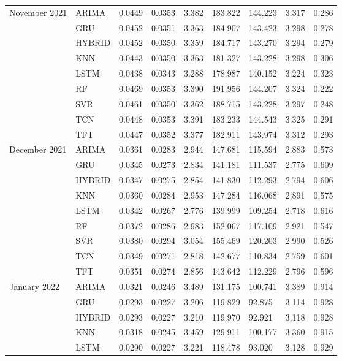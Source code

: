 \begin{tabular}{lllllllll}
November 2021 & ARIMA & 0.0449 & 0.0353 & 3.382 & 183.822 & 144.223 & 3.317 & 0.286 \\
 & GRU & 0.0452 & 0.0351 & 3.363 & 184.907 & 143.423 & 3.298 & 0.278 \\
 & HYBRID & 0.0452 & 0.0350 & 3.359 & 184.717 & 143.270 & 3.294 & 0.279 \\
 & KNN & 0.0443 & 0.0350 & 3.363 & 181.327 & 143.228 & 3.298 & 0.306 \\
 & LSTM & 0.0438 & 0.0343 & 3.288 & 178.987 & 140.152 & 3.224 & 0.323 \\
 & RF & 0.0469 & 0.0353 & 3.390 & 191.956 & 144.207 & 3.324 & 0.222 \\
 & SVR & 0.0461 & 0.0350 & 3.362 & 188.715 & 143.228 & 3.297 & 0.248 \\
 & TCN & 0.0448 & 0.0353 & 3.391 & 183.233 & 144.543 & 3.325 & 0.291 \\
 & TFT & 0.0447 & 0.0352 & 3.377 & 182.911 & 143.974 & 3.312 & 0.293 \\
December 2021 & ARIMA & 0.0361 & 0.0283 & 2.944 & 147.681 & 115.594 & 2.883 & 0.573 \\
 & GRU & 0.0345 & 0.0273 & 2.834 & 141.181 & 111.537 & 2.775 & 0.609 \\
 & HYBRID & 0.0347 & 0.0275 & 2.854 & 141.830 & 112.293 & 2.794 & 0.606 \\
 & KNN & 0.0360 & 0.0284 & 2.953 & 147.284 & 116.068 & 2.891 & 0.575 \\
 & LSTM & 0.0342 & 0.0267 & 2.776 & 139.999 & 109.254 & 2.718 & 0.616 \\
 & RF & 0.0372 & 0.0286 & 2.983 & 152.067 & 117.109 & 2.921 & 0.547 \\
 & SVR & 0.0380 & 0.0294 & 3.054 & 155.469 & 120.203 & 2.990 & 0.526 \\
 & TCN & 0.0349 & 0.0271 & 2.818 & 142.677 & 110.834 & 2.759 & 0.601 \\
 & TFT & 0.0351 & 0.0274 & 2.856 & 143.642 & 112.229 & 2.796 & 0.596 \\
January 2022 & ARIMA & 0.0321 & 0.0246 & 3.489 & 131.175 & 100.741 & 3.389 & 0.914 \\
 & GRU & 0.0293 & 0.0227 & 3.206 & 119.829 & 92.875 & 3.114 & 0.928 \\
 & HYBRID & 0.0293 & 0.0227 & 3.210 & 119.970 & 92.921 & 3.118 & 0.928 \\
 & KNN & 0.0318 & 0.0245 & 3.459 & 129.911 & 100.177 & 3.360 & 0.915 \\
 & LSTM & 0.0290 & 0.0227 & 3.221 & 118.478 & 93.020 & 3.128 & 0.929 \\

\end{tabular}
